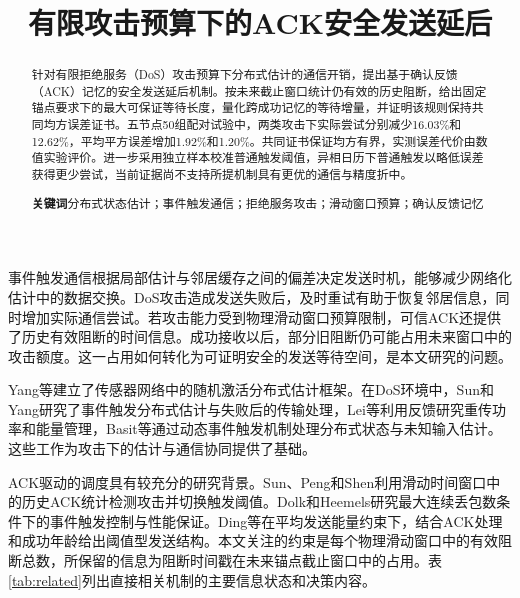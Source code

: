 \documentclass[UTF8,a4paper,zihao=5,fontset=windows]{ctexart}
\title{\heiti 有限攻击预算下的ACK安全发送延后}
\author{}
\date{}
\begin{document}
\maketitle
\thispagestyle{fancy}
\begin{abstract}
针对有限拒绝服务（DoS）攻击预算下分布式估计的通信开销，提出基于确认反馈（ACK）记忆的安全发送延后机制。按未来截止窗口统计仍有效的历史阻断，给出固定锚点要求下的最大可保证等待长度，量化跨成功记忆的等待增量，并证明该规则保持共同均方误差证书。五节点50组配对试验中，两类攻击下实际尝试分别减少16.03\%和12.62\%，平均平方误差增加1.92\%和1.20\%。共同证书保证均方有界，实测误差代价由数值实验评价。进一步采用独立样本校准普通触发阈值，异相日历下普通触发以略低误差获得更少尝试，当前证据尚不支持所提机制具有更优的通信与精度折中。

\noindent\textbf{关键词}\quad 分布式状态估计；事件触发通信；拒绝服务攻击；滑动窗口预算；确认反馈记忆
\end{abstract}


事件触发通信根据局部估计与邻居缓存之间的偏差决定发送时机，能够减少网络化估计中的数据交换。DoS攻击造成发送失败后，及时重试有助于恢复邻居信息，同时增加实际通信尝试。若攻击能力受到物理滑动窗口预算限制，可信ACK还提供了历史有效阻断的时间信息。成功接收以后，部分旧阻断仍可能占用未来窗口中的攻击额度。这一占用如何转化为可证明安全的发送等待空间，是本文研究的问题。

Yang等建立了传感器网络中的随机激活分布式估计框架\cite{Paper_Yang2014_StochasticActivation}。在DoS环境中，Sun和Yang研究了事件触发分布式估计与失败后的传输处理\cite{Paper_FUS33_2022}，Lei等利用反馈研究重传功率和能量管理\cite{Paper_FUS42_2022}，Basit等通过动态事件触发机制处理分布式状态与未知输入估计\cite{Paper_FUS37_2023}。这些工作为攻击下的估计与通信协同提供了基础。

ACK驱动的调度具有较充分的研究背景。Sun、Peng和Shen利用滑动时间窗口中的历史ACK统计检测攻击并切换触发阈值\cite{Paper_FUS06_Sun2024}。Dolk和Heemels研究最大连续丢包数条件下的事件触发控制与性能保证\cite{Paper_FUS47_2017}。Ding等在平均发送能量约束下，结合ACK处理和成功年龄给出阈值型发送结构\cite{Paper_FUS48_Ding2016}。本文关注的约束是每个物理滑动窗口中的有效阻断总数，所保留的信息为阻断时间戳在未来锚点截止窗口中的占用。表\ref{tab:related}列出直接相关机制的主要信息状态和决策内容。
\end{document}

